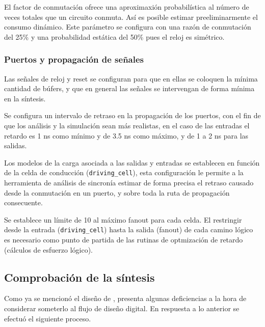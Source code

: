 El factor de conmutación ofrece una aproximaxión probabilística al número de veces totales que un circuito conmuta. Así es posible estimar preeliminarmente el consumo dinámico. Este parámetro se configura con una razón de conmutación del 25\% y una probabilidad estática del 50\% pues el reloj es simétrico.

\subsubsection{Puertos y propagación de señales}

Las señales de reloj y reset se configuran para que en ellas se coloquen la mínima cantidad de búfers, y que en general las señales se intervengan de forma mínima en la síntesis. 

Se configura un intervalo de retraso en la propagación de los puertos, con el fin de que los análisis y la simulación sean más realistas, en el caso de las entradas el retardo es 1 ns como mínimo y de 3.5 ns como máximo, y de 1 a 2 ns para las salidas.

Los modelos de la carga asociada a las salidas y entradas se establecen en función de la celda de conducción (\texttt{driving\_cell}), esta configuración le permite a la herramienta de análisis de sincronía estimar de forma precisa el retraso causado desde la conmutación en un puerto, y sobre toda la ruta de propagación consecuente.

Se establece un límite de 10 al máximo fanout para cada celda. El restringir desde la entrada (\texttt{driving\_cell}) hasta la salida (fanout) de cada camino lógico es necesario como punto de partida de las rutinas de optmización de retardo (cálculos de esfuerzo lógico). 

\subsection{Comprobación de la síntesis}
\label{sec:comp_syn}
Como ya se mencionó el diseño de \cite{Carlosthesis}, presenta algunas deficiencias a la hora de considerar someterlo al flujo de diseño digital. En respuesta a lo anterior se efectuó el siguiente proceso.

